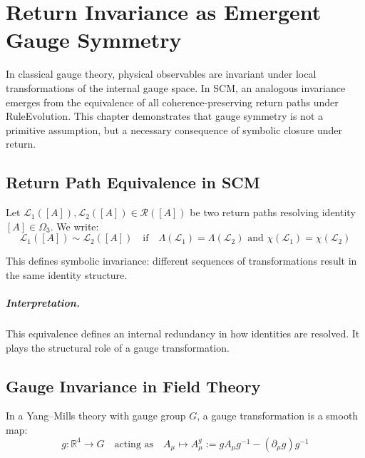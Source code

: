 \chapter{Return Invariance as Emergent Gauge Symmetry} \label{chapter-return-invariance}

In classical gauge theory, physical observables are invariant under local transformations of the internal gauge space. In SCM, an analogous invariance emerges from the equivalence of all coherence-preserving return paths under RuleEvolution. This chapter demonstrates that gauge symmetry is not a primitive assumption, but a necessary consequence of symbolic closure under return.

\section{Return Path Equivalence in SCM}

\begin{definition}
Let \( \mathcal{L}_1([A]), \mathcal{L}_2([A]) \in \mathcal{R}([A]) \) be two return paths resolving identity \( [A] \in \Omega_3 \). We write:
\[
\mathcal{L}_1([A]) \sim \mathcal{L}_2([A])
\quad \text{if} \quad
\Lambda(\mathcal{L}_1) = \Lambda(\mathcal{L}_2) \text{ and } \chi(\mathcal{L}_1) = \chi(\mathcal{L}_2)
\]
\end{definition}

This defines symbolic invariance: different sequences of transformations result in the same identity structure.

\paragraph{Interpretation.}
This equivalence defines an internal redundancy in how identities are resolved. It plays the structural role of a gauge transformation.

\section{Gauge Invariance in Field Theory}

\begin{definition}
In a Yang--Mills theory with gauge group \( G \), a gauge transformation is a smooth map:
\[
g: \mathbb{R}^4 \to G
\quad \text{acting as} \quad
A_\mu \mapsto A_\mu^g := g A_\mu g^{-1} - (\partial_\mu g) g^{-1}
\]
\end{definition}

